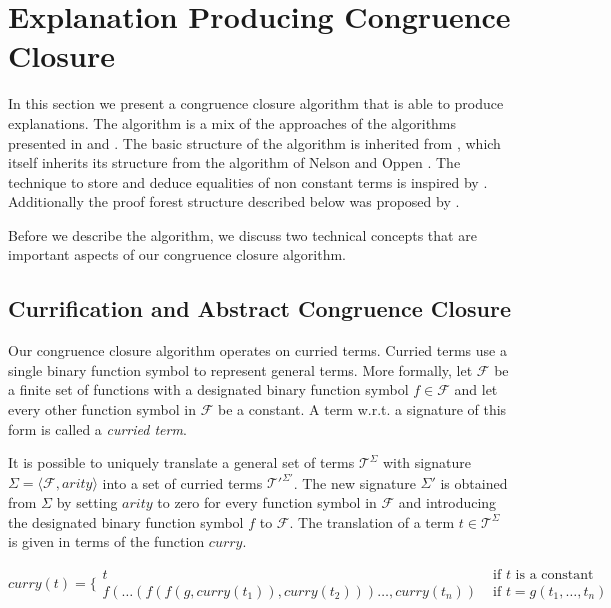 \section{Explanation Producing Congruence Closure}
\label{sec:algorithm}
%
In this section we present a congruence closure algorithm that is able to produce explanations.
The algorithm is a mix of the approaches of the algorithms presented in \cite{Fontaine2004} and \cite{Nieuwenhuis2005,Nieuwenhuis2007}.
The basic structure of the algorithm is inherited from \cite{Fontaine2004}, which itself inherits its structure from the algorithm of Nelson and Oppen \cite{Nelson1980}.
The technique to store and deduce equalities of non constant terms is inspired by \cite{Nieuwenhuis2005,Nieuwenhuis2007}.
Additionally the proof forest structure described below was proposed by \cite{Nieuwenhuis2005,Nieuwenhuis2007}.

Before we describe the algorithm, we discuss two technical concepts that are important aspects of our congruence closure algorithm.

\subsection*{Currification and Abstract Congruence Closure}
\label{subsec:algorithms_preliminaries}

Our congruence closure algorithm operates on curried terms.
Curried terms use a single binary function symbol to represent general terms.
More formally, let $\mathcal{F}$ be a finite set of functions with a designated binary function symbol $f \in \mathcal{F}$ and let every other function symbol in $\mathcal{F}$ be a constant.
A term w.r.t. a signature of this form is called a \emph{curried term}.

It is possible to uniquely translate a general set of terms $\mathcal{T}^{\Sigma}$ with signature $\Sigma = \langle \mathcal{F},arity \rangle$ into a set of curried terms $\mathcal{T'}^{\Sigma'}$.
The new signature $\Sigma'$ is obtained from $\Sigma$ by setting $arity$ to zero for every function symbol in $\mathcal{F}$ and introducing the designated binary function symbol $f$ to $\mathcal{F}$.
The translation of a term $t \in \mathcal{T}^{\Sigma}$ is given in terms of the function $curry$.

$$
curry(t) = \Big\{
\begin{array}{ll}
	t & \text{ if } t \text{ is a constant }\\
	f(\ldots (f(f(g,curry(t_1)),curry(t_2)))\ldots,curry(t_n)) &\text{ if } t = g(t_1,\ldots, t_n)
\end{array}
$$

